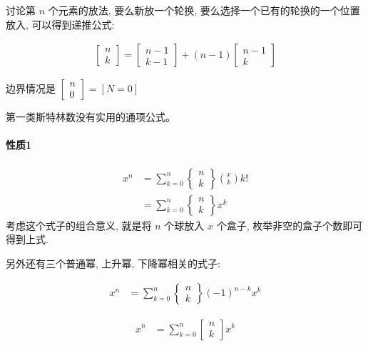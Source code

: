 \documentclass{ctexart}
\begin{document}
讨论第 $n$ 个元素的放法, 要么新放一个轮换, 要么选择一个已有的轮换的一个位置放入, 可以得到递推公式:

\begin{align*}
    \begin{bmatrix} n\\ k \end{bmatrix} = \begin{bmatrix} {n-1}\\ {k-1} \end{bmatrix} + (n-1) \begin{bmatrix} {n-1}\\ k \end{bmatrix}
\end{align*}

边界情况是 $\begin{bmatrix} n\\ 0 \end{bmatrix}=[N=0]$

第一类斯特林数没有实用的通项公式。

\paragraph{性质1}

\begin{align*}
    x^n &= \sum_{k=0}^{n} \begin{Bmatrix} n\\ k \end{Bmatrix} \binom{x}{k} k!\\
        &= \sum_{k=0}^{n} \begin{Bmatrix} n\\ k \end{Bmatrix} x^{\underline{k}}
\end{align*}
考虑这个式子的组合意义, 就是将 $n$ 个球放入 $x$ 个盒子, 枚举非空的盒子个数即可得到上式.

另外还有三个普通幂, 上升幂, 下降幂相关的式子:

\begin{align*}
    x^n &= \sum_{k=0}^{n} \begin{Bmatrix} n\\ k \end{Bmatrix} (-1)^{n-k} x^{\overline{k}}    
\end{align*}

\begin{align*}
    x^{\overline{n}} &= \sum_{k=0}^{n} \begin{bmatrix} n\\ k \end{bmatrix} x^k
\end{align*}
\end{document}
